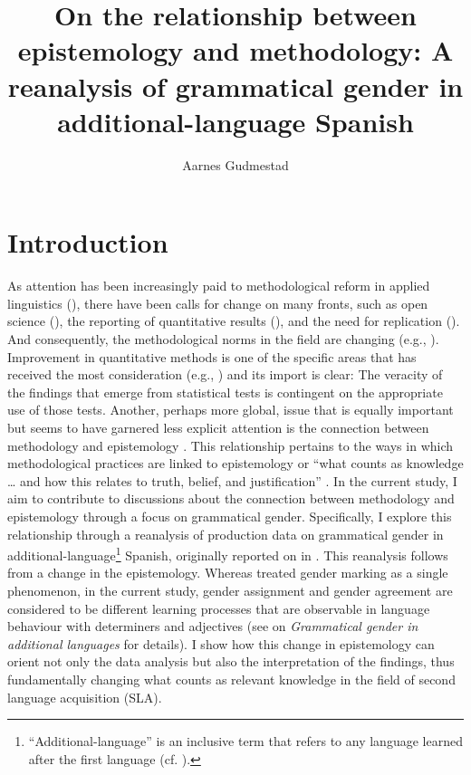 \documentclass[output=paper,colorlinks,citecolor=brown,modfonts,nonflat]{../langscibook}
\author{Aarnes Gudmestad\affiliation{Virginia Polytechnic Institute and State University}\orcid{}}
\title{On the relationship between epistemology and methodology: A reanalysis of grammatical gender in additional-language Spanish}
\begin{document}
\maketitle 
{}

\section{Introduction}\label{sec:gudmestad:1}

As attention has been increasingly paid to methodological reform in applied linguistics (\citealt{Byrnes2013,PhakitiEtAl2018}), there have been calls for change on many fronts, such as open science (\citealt{MarsdenPlonsky2018}), the reporting of quantitative results (\citealt{Larsen-HallPlonsky2015}), and the need for replication (\citealt{PorteMcManus2018}). And consequently, the methodological norms in the field are changing (e.g., \citealt{MarsdenEtAl2018Reports}). Improvement in quantitative methods is one of the specific areas that has received the most consideration (e.g., \citealt{Plonsky2015}) and its import is clear: The veracity of the findings that emerge from statistical tests is contingent on the appropriate use of those tests. Another, perhaps more global, issue that is equally important but seems to have garnered less explicit attention is the connection between methodology and epistemology \citep{Ortega2005}. This relationship pertains to the ways in which methodological practices are linked to epistemology or “what counts as knowledge … and how this relates to truth, belief, and justification” \citep[40]{Young2018}. In the current study, I aim to contribute to discussions about the connection between methodology and epistemology through a focus on grammatical gender. Specifically, I explore this relationship through a reanalysis of production data on grammatical gender in additional-language\footnote{{``Additional-language'' is an inclusive term that refers to any language learned after the first language (cf. \citealt{TheDouglasFirGroup2016}).}} Spanish, originally reported on in \citet{GudmestadEtAl2019}. This reanalysis follows from a change in the epistemology. Whereas \citeauthor{GudmestadEtAl2019} treated gender marking as a single phenomenon, in the current study, gender assignment and gender agreement are considered to be different learning processes that are observable in language behaviour with determiners and adjectives (see  on \textit{Grammatical gender in additional languages} for details). I show how this change in epistemology can orient not only the data analysis but also the interpretation of the findings, thus fundamentally changing what counts as relevant knowledge in the field of second language acquisition (SLA).
\end{document}
